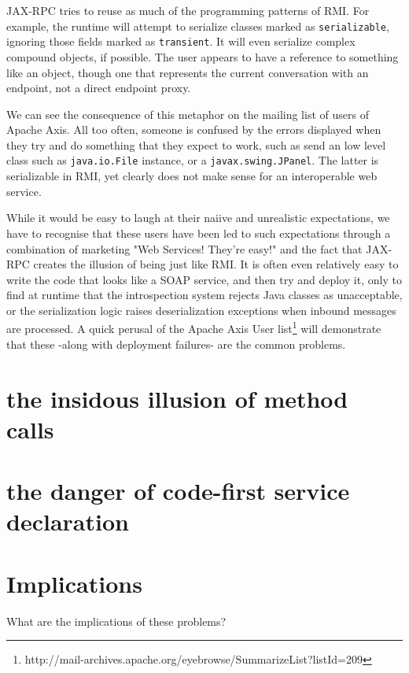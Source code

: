 \documentclass[draft]{article}
\begin{document}
JAX-RPC tries to reuse as much of the programming patterns of RMI. For example,
the runtime will attempt to serialize classes marked as \verb|serializable|,
ignoring those fields marked as \verb|transient|. It will even serialize complex
compound objects, if possible. The user appears to have a reference to something
like an object, though one that represents the current conversation with an endpoint,
not a direct endpoint proxy. 


We can see the consequence of this metaphor on the mailing list of users of
Apache Axis. All too often, someone is confused by the errors displayed when
they try and do something that they expect to work, such as send an low level
class such as \verb|java.io.File| instance, or a \verb|javax.swing.JPanel|. The
latter is serializable in RMI, yet clearly does not make sense for an
interoperable web service. 

While it would be easy to laugh at their naiive and unrealistic
expectations, we have to recognise that these users have been led to
such expectations through a combination of marketing "Web Services!
They're easy!" and the fact that JAX-RPC creates the illusion of being
just like RMI. It is often even relatively easy to write the code that
looks like a SOAP service, and then try and deploy it, only to find at
runtime that the introspection system rejects Java classes as
unacceptable, or the serialization logic raises deserialization
exceptions when inbound messages are processed. A quick perusal of the
Apache Axis User
list\footnote{http://mail-archives.apache.org/eyebrowse/SummarizeList?listId=209}
will demonstrate that these -along with deployment failures- are the
common problems.


\section{the insidous illusion of method calls}

\section{the danger of code-first service declaration}



\section{Implications}

What are the implications of these problems?
\end{document}
